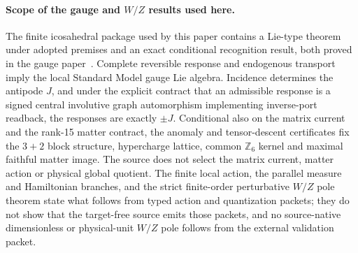 \paragraph{Scope of the gauge and \(W/Z\) results used here.}
The finite icosahedral package used by this paper contains a Lie-type theorem
under adopted premises and an exact conditional recognition result, both
proved in the gauge paper~\cite{ophGauge}. Complete reversible response and
endogenous transport imply the local Standard Model gauge Lie algebra.
Incidence determines the antipode \(J\), and under the explicit contract that
an admissible response is a signed central involutive graph automorphism
implementing inverse-port readback, the responses are exactly \(\pm J\).
Conditional also on the matrix current and the rank-15 matter contract, the
anomaly and tensor-descent certificates fix the \(3+2\) block structure,
hypercharge lattice, common \(\mathbb Z_6\) kernel and maximal faithful matter
image. The source does not select the matrix current, matter action or
physical global quotient. The finite local action, the parallel measure and
Hamiltonian branches, and the strict finite-order perturbative \(W/Z\) pole
theorem state what follows from typed action and quantization packets; they
do not show that the target-free source emits those packets, and no
source-native dimensionless or physical-unit \(W/Z\) pole follows from the
external validation packet.
